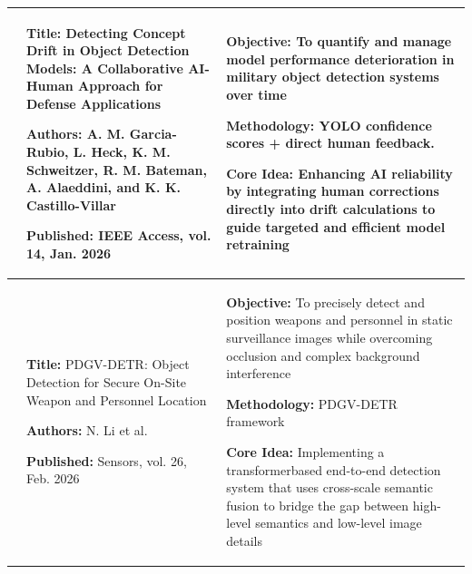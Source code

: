 \begin{center}
\begin{longtable}{
        |>{\centering\arraybackslash}p{1.22cm}
        |>{\raggedright\arraybackslash}p{6.3cm}
        |>{\raggedright\arraybackslash}p{6.3cm}|
        }
        8                                                                                            &
        \textbf{Title:} Detecting Concept Drift in Object Detection Models: A Collaborative AI-Human Approach for Defense Applications \par
        \textbf{Authors:} A. M. Garcia-Rubio, L. Heck, K. M. Schweitzer, R. M. Bateman, A. Alaeddini, and
        K. K. Castillo-Villar \par
        \textbf{Published:} IEEE Access, vol. 14, Jan. 2026                                          &
        \textbf{Objective:} To quantify and manage model performance deterioration in military object detection systems over time \par
        \textbf{Methodology:} YOLO confidence scores + direct human feedback.\par
        \textbf{Core Idea:} Enhancing AI reliability by integrating human corrections directly into drift calculations to guide targeted and efficient model retraining                                  \\
        \hline

        9                                                                                            &
        \textbf{Title:} PDGV-DETR: Object Detection for Secure On-Site Weapon and Personnel Location \par
        \textbf{Authors:} N. Li et al. \par
        \textbf{Published:} Sensors,
        vol. 26, Feb. 2026                                                                           &
        \textbf{Objective:} To precisely detect and position weapons and personnel in static surveillance images while overcoming occlusion and complex background interference \par
        \textbf{Methodology:} PDGV-DETR framework \par
        \textbf{Core Idea:} Implementing a transformerbased end-to-end detection system that uses cross-scale semantic fusion to bridge the gap between high-level semantics and low-level image details \\
        \hline


\end{longtable}
\end{center}
